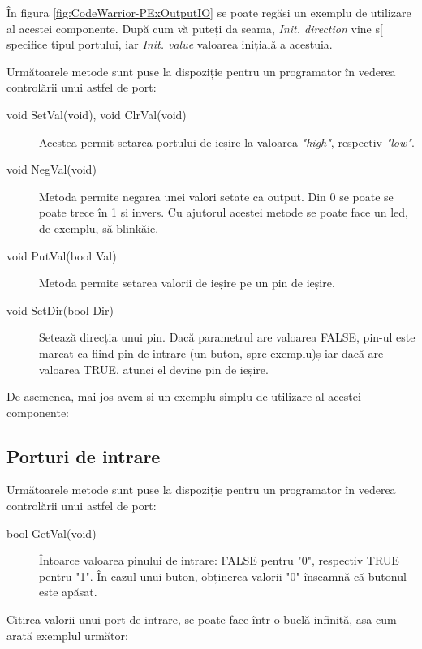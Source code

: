 În figura \ref{fig:CodeWarrior-PExOutputIO} se poate regăsi un exemplu de utilizare al acestei componente. După cum vă puteți da seama, \textit{Init. direction} vine s[ specifice tipul portului, iar \textit{Init. value} valoarea inițială a acestuia.

Următoarele metode sunt puse la dispoziție pentru un programator în vederea controlării unui astfel de port:
\begin{description}
    \item[void SetVal(void), void ClrVal(void)] Acestea permit setarea portului de ieșire la valoarea \textit{"high"}, respectiv \textit{"low"}. 
    \item[void NegVal(void)] Metoda permite negarea unei valori setate ca output. Din 0 se poate se poate trece în 1 și invers. Cu ajutorul acestei metode se poate face un led, de exemplu, să blinkăie.
    \item[void PutVal(bool Val)] Metoda permite setarea valorii de ieșire pe un pin de ieșire.
    \item[void SetDir(bool Dir)] Setează direcția unui pin. Dacă parametrul are valoarea FALSE, pin-ul este marcat ca fiind pin de intrare (un buton, spre exemplu)ș iar dacă are valoarea TRUE, atunci el devine pin de ieșire.
\end{description}

De asemenea, mai jos avem și un exemplu simplu de utilizare al acestei componente:



\subsection{Porturi de intrare}

Următoarele metode sunt puse la dispoziție pentru un programator în vederea controlării unui astfel de port:

\begin{description}
    \item[bool GetVal(void)] Întoarce valoarea pinului de intrare: FALSE pentru "0", respectiv TRUE pentru "1". În cazul unui buton, obținerea valorii "0" înseamnă că butonul este apăsat.
\end{description}

Citirea valorii unui port de intrare, se poate face într-o buclă infinită, așa cum arată exemplul următor:



